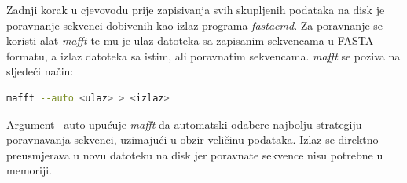 Zadnji korak u cjevovodu prije zapisivanja svih skupljenih podataka na disk je
poravnanje sekvenci dobivenih kao izlaz programa \emph{fastacmd}. Za poravnanje
se koristi alat \emph{mafft}\cite{mafft} te mu je ulaz datoteka sa zapisanim sekvencama u FASTA
formatu, a izlaz datoteka sa istim, ali poravnatim sekvencama. \emph{mafft} se
poziva na sljedeći način:
\begin{lstlisting}[language=bash]
mafft --auto <ulaz> > <izlaz>
\end{lstlisting} 
Argument --auto upućuje \emph{mafft} da automatski odabere najbolju strategiju
poravnavanja sekvenci, uzimajući u obzir veličinu podataka. Izlaz se direktno
preusmjerava u novu datoteku na disk jer poravnate sekvence nisu potrebne u
memoriji.




